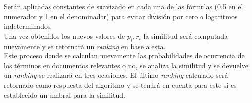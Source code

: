 \documentclass[spanish]{article}
\begin{document}
			Serán aplicadas constantes de suavizado en cada una de las fórmulas (0.5 en el numerador y 1 en el denominador) para evitar división por cero o logaritmos indeterminados.\\
			
			Una vez obtenidos los nuevos valores de $ p_i, r_i $ la similitud será computada nuevamente y se retornará un \emph{ranking} en base a esta.\\

			Este proceso donde se calculan nuevamente las probabilidades de ocurrencia de los términos en documentos relevantes o no, se analiza la similitud y se devuelve un \emph{ranking} se realizará en tres ocasiones. El último \emph{ranking} calculado será retornado como respuesta del algoritmo y se tendrá en cuenta para este si es establecido un umbral para la similitud.
\end{document}
